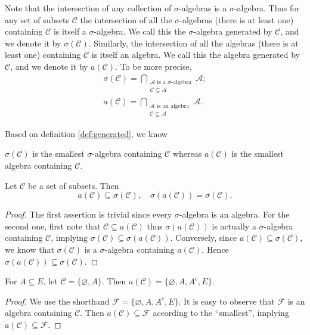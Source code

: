 \documentclass[11pt,singlecolumn, openany, citestyle=authoryear]{elegantbook}
\begin{document}
\begin{CJK}{UTF8}{gbsn}
\begin{definition}\label{def:generated}
    Note that the intersection of any collection of $\sigma$-algebras is a 
    $\sigma$-algebra. Thus for any set of
subsets $\mathcal{C} $ the intersection of all the $\sigma$-algebras 
(there is at least one) containing $\mathcal{C} $ is itself a
$\sigma$-algebra. We call this the $\sigma$-algebra generated by $\mathcal{C}$,
and we denote it by $\sigma(\mathcal{C})$. Similarly, the intersection of all the algebras 
(there is at least one) containing $\mathcal{C} $ is itself an algebra. 
We call this the algebra generated by $\mathcal{C}$,
and we denote it by $a(\mathcal{C})$. To be more precise,
\begin{gather*}
    \sigma(\mathcal{C}) = \bigcap_{\substack{\mathcal{A} \text{ is a $\sigma$-algebra}\\
    \mathcal{C}\subseteq \mathcal{A}}}\mathcal{A};\\
    a(\mathcal{C}) = \bigcap_{\substack{\mathcal{A} \text{ is an algebra}\\
    \mathcal{C}\subseteq \mathcal{A}}}\mathcal{A}.
\end{gather*}
\end{definition}
Based on definition \ref{def:generated}, we know 
\begin{proposition}
    $\sigma(\mathcal{C})$ is the smallest $\sigma$-algebra containing $\mathcal{C}$
    whereas $a(\mathcal{C})$ is the smallest algebra containing $\mathcal{C}$.
\end{proposition}

\begin{proposition}
    Let $\mathcal{C}$ be a set of subsets. Then 
    $$
    a(\mathcal{C})\subseteq \sigma(\mathcal{C}), \quad 
    \sigma(a(\mathcal{C}))= \sigma(\mathcal{C}).
    $$
\end{proposition}
\begin{proof}
    The first assertion is trivial since every $\sigma$-algebra is an algebra.
    For the second one, first note that $\mathcal{C} \subseteq a(\mathcal{C})$ thus
    $\sigma(a(\mathcal{C}))$ is actually a $\sigma$-algebra containing $\mathcal{C}$, implying
    $\sigma(\mathcal{C})\subseteq \sigma(a(\mathcal{C}))$.   
    Conversely, since $a(\mathcal{C})\subseteq \sigma(\mathcal{C})$, we know that 
    $\sigma(\mathcal{C})$ is a $\sigma$-algebra containing $a(\mathcal{C})$. Hence 
    $\sigma(a(\mathcal{C}))\subseteq \sigma(\mathcal{C})$.
\end{proof}

\begin{example}
    For $A \subseteq E$, 
    let $\mathcal{C}=\{\varnothing, A\}$. Then 
    $a(\mathcal{C})=\{\varnothing, A, A^c, E\}$.
\end{example}
\begin{proof}
    We use the shorthand $\mathcal{F}=\{\varnothing, A, A^c, E\}$. It is easy to observe 
    that $\mathcal{F}$ is an algebra containing $\mathcal{C}$.
    Then $a(\mathcal{C}) \subseteq \mathcal{F}$ according to the ``smallest'', implying 
    $a(\mathcal{C})\subseteq \mathcal{F}$.


\end{proof}
\end{CJK}
\end{document}
